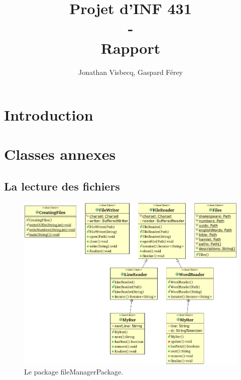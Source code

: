 \documentclass[12pt,a4paper,titlepage]{article}
\author{Jonathan Visbecq, Gaspard Férey}
\title{Projet d'INF 431 \\ - \\ Rapport}
\begin{document}
\maketitle

\tableofcontents
\newpage

\section*{Introduction}

\section*{Classes annexes}

\subsection*{La lecture des fichiers}

\begin{figure}
	\label{fig:fileManagerPackage}
	\centering
	\includegraphics[scale=0.65, angle=90]{../Java Workspace/Test Hash/fileManagerPackage.png}
	\caption{Le package fileManagerPackage.}
\end{figure}
\end{document}
